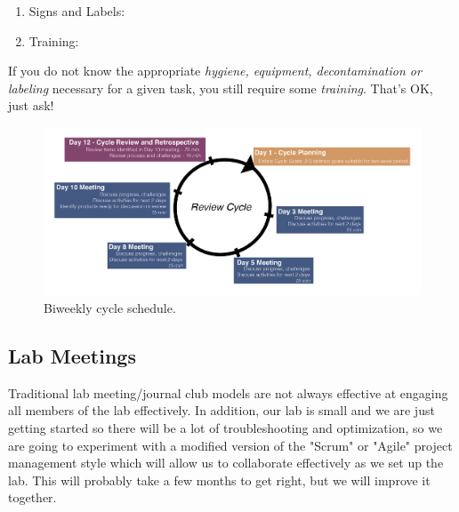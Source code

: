 \documentclass[10pt, letterpaper, twocolumn]{article} %
\begin{document}
\begin{enumerate}
	\item Signs and Labels:
	\item Training:
\end{enumerate}
If you do not know the appropriate {\it hygiene, equipment, decontamination or labeling} necessary for a given task, you still require some {\it training}. That’s OK, just ask!

\begin{figure}
  \includegraphics[width=\textwidth]{Core_Competencies-02.png}
  \caption{Biweekly cycle schedule.}
\end{figure}
\subsection{Lab Meetings}
Traditional lab meeting/journal club models are not always effective at engaging all members of the lab effectively.  In addition, our lab is small and we are just getting started so there will be a lot of troubleshooting and optimization, so we are going to experiment with a modified version of the "Scrum" or "Agile" project management style \citep{May2019-kp} which will allow us to collaborate effectively as we set up the lab. This will probably take a few months to get right, but we will improve it together.
\end{document}
